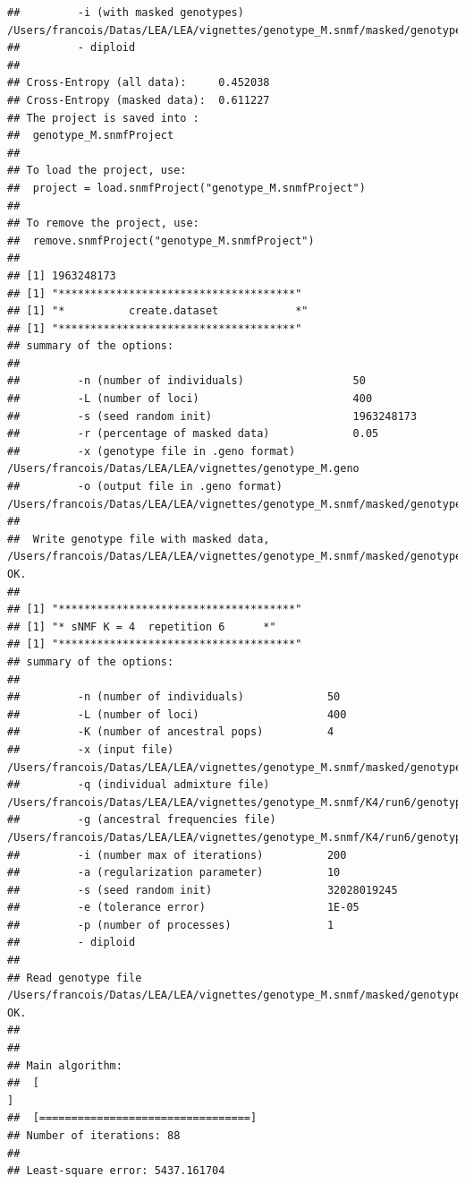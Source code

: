 \documentclass[12pt,a4paper,oneside]{article}\usepackage[]{graphicx}\usepackage[]{color}
\makeatletter
\newenvironment{kframe}{%
 \def\at@end@of@kframe{}%
 \ifinner\ifhmode%
  \def\at@end@of@kframe{\end{minipage}}%
  \begin{minipage}{\columnwidth}%
 \fi\fi%
 \def\FrameCommand##1{\hskip\@totalleftmargin \hskip-\fboxsep
 \colorbox{shadecolor}{##1}\hskip-\fboxsep
     \hskip-\linewidth \hskip-\@totalleftmargin \hskip\columnwidth}%
 \MakeFramed {\advance\hsize-\width
   \@totalleftmargin\z@ \linewidth\hsize
   \@setminipage}}%
 {\par\unskip\endMakeFramed%
 \at@end@of@kframe}
\newenvironment{knitrout}{}{} %
\makeatother
\begin{document}
\begin{knitrout}
\begin{kframe}
\begin{verbatim}
##         -i (with masked genotypes)         /Users/francois/Datas/LEA/LEA/vignettes/genotype_M.snmf/masked/genotype_M_I.geno
##         - diploid
## 
## Cross-Entropy (all data):	 0.452038
## Cross-Entropy (masked data):	 0.611227
## The project is saved into :
##  genotype_M.snmfProject 
## 
## To load the project, use:
##  project = load.snmfProject("genotype_M.snmfProject")
## 
## To remove the project, use:
##  remove.snmfProject("genotype_M.snmfProject")
## 
## [1] 1963248173
## [1] "*************************************"
## [1] "*          create.dataset            *"
## [1] "*************************************"
## summary of the options:
## 
##         -n (number of individuals)                 50
##         -L (number of loci)                        400
##         -s (seed random init)                      1963248173
##         -r (percentage of masked data)             0.05
##         -x (genotype file in .geno format)         /Users/francois/Datas/LEA/LEA/vignettes/genotype_M.geno
##         -o (output file in .geno format)           /Users/francois/Datas/LEA/LEA/vignettes/genotype_M.snmf/masked/genotype_M_I.geno
## 
##  Write genotype file with masked data, /Users/francois/Datas/LEA/LEA/vignettes/genotype_M.snmf/masked/genotype_M_I.geno:		OK.
## 
## [1] "*************************************"
## [1] "* sNMF K = 4  repetition 6      *"
## [1] "*************************************"
## summary of the options:
## 
##         -n (number of individuals)             50
##         -L (number of loci)                    400
##         -K (number of ancestral pops)          4
##         -x (input file)                        /Users/francois/Datas/LEA/LEA/vignettes/genotype_M.snmf/masked/genotype_M_I.geno
##         -q (individual admixture file)         /Users/francois/Datas/LEA/LEA/vignettes/genotype_M.snmf/K4/run6/genotype_M_r6.4.Q
##         -g (ancestral frequencies file)        /Users/francois/Datas/LEA/LEA/vignettes/genotype_M.snmf/K4/run6/genotype_M_r6.4.G
##         -i (number max of iterations)          200
##         -a (regularization parameter)          10
##         -s (seed random init)                  32028019245
##         -e (tolerance error)                   1E-05
##         -p (number of processes)               1
##         - diploid
## 
## Read genotype file /Users/francois/Datas/LEA/LEA/vignettes/genotype_M.snmf/masked/genotype_M_I.geno:		OK.
## 
## 
## Main algorithm:
## 	[                                                                           ]
## 	[=================================]
## Number of iterations: 88
## 
## Least-square error: 5437.161704

\end{verbatim}
\end{kframe}
\end{knitrout}
\end{document}
